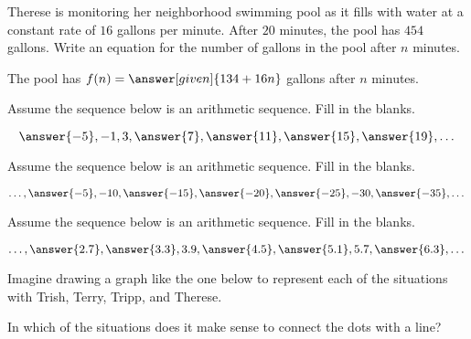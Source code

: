 \documentclass[nooutcomes]{ximera}
\begin{document}
\begin{problem}
Therese is monitoring her neighborhood swimming pool as it fills with water at a constant rate of $16$ gallons per minute.  After $20$ minutes, the pool has $454$ gallons.  Write an equation for the number of gallons in the pool after $n$ minutes.

\begin{prompt}
The pool has $f(n) = \answer[given]{134+16n}$ gallons after $n$ minutes.
\end{prompt}
\end{problem}




\begin{problem}
Assume the sequence below is an arithmetic sequence.  Fill in the blanks.

\[
\answer{-5}, -1, 3, \answer{7}, \answer{11}, \answer{15}, \answer{19}, \dots
\]

\end{problem}





\begin{problem}
Assume the sequence below is an arithmetic sequence.  Fill in the blanks.

\[
\dots, \answer{-5}, -10, \answer{-15}, \answer{-20}, \answer{-25}, -30, \answer{-35}, \dots
\]

\end{problem}




\begin{problem}
Assume the sequence below is an arithmetic sequence.  Fill in the blanks.

\[
\dots, \answer{2.7}, \answer{3.3}, 3.9, \answer{4.5}, \answer{5.1}, 5.7, \answer{6.3}, \dots
\]

\end{problem}




\begin{problem}
Imagine drawing a graph like the one below to represent each of the situations with Trish, Terry, Tripp, and Therese.

\begin{center}
\end{center}

In which of the situations does it make sense to connect the dots with a line?
\begin{selectAll}
\end{selectAll}




\end{problem}
\end{document}
